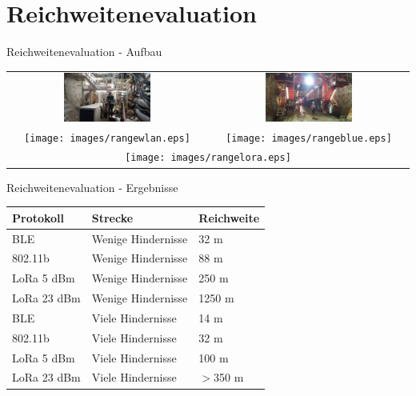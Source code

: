 \documentclass[18pt]{beamer}
\begin{document}
\section{Reichweitenevaluation}
\begin{frame}{Reichweitenevaluation - Aufbau}
	\begin{tabular}{cc}
		\includegraphics[width=0.45\textwidth]{images/tunnel.jpg} & \includegraphics[width=0.45\textwidth]{images/schalungswagen.jpg}\\
		\texttt{[image: images/rangewlan.eps]} & \texttt{[image: images/rangeblue.eps]} \\
		\multicolumn{2}{c}{\texttt{[image: images/rangelora.eps]}}\\
	\end{tabular}
\end{frame}

\begin{frame}{Reichweitenevaluation - Ergebnisse}
	\centering
	\begin{tabular}{l|l|l}
		Protokoll & Strecke & Reichweite \\
		\hline
		BLE & Wenige Hindernisse & 32 m \\
		802.11b & Wenige Hindernisse & 88 m \\
		LoRa 5 dBm & Wenige Hindernisse & 250 m \\
		LoRa 23 dBm & Wenige Hindernisse & 1250 m \\
		\hline
		\pause
		BLE & Viele Hindernisse & 14 m \\
		802.11b & Viele Hindernisse & 32 m \\
		LoRa 5 dBm & Viele Hindernisse & 100 m \\
		LoRa 23 dBm & Viele Hindernisse & $>$350 m \\
	\end{tabular}\\
\end{frame}
\end{document}
